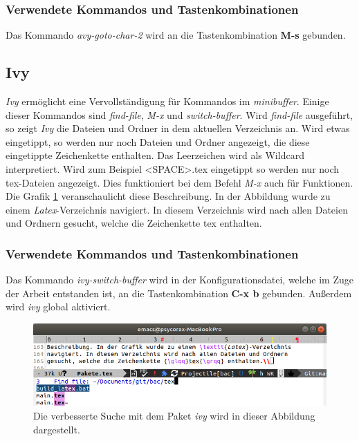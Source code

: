 \subsubsection{Verwendete Kommandos und Tastenkombinationen}
Das Kommando \textit{avy-goto-char-2} wird an die Tastenkombination
\textbf{M-s} gebunden.\\

\subsection{Ivy}
\label{subsec:ivy}
\textit{Ivy} ermöglicht eine Vervollständigung für Kommandos im
\textit{minibuffer}. Einige dieser Kommandos sind \textit{find-file},
\textit{M-x} und \textit{switch-buffer}. Wird \textit{find-file}
ausgeführt, so zeigt \textit{Ivy} die Dateien und Ordner in dem
aktuellen Verzeichnis an. Wird etwas eingetippt, so werden nur noch
Dateien und Ordner angezeigt, die diese eingetippte Zeichenkette
enthalten. Das Leerzeichen wird als Wildcard interpretiert. Wird zum
Beispiel {\glqq}<SPACE>.tex{\grqq} eingetippt so werden nur noch
tex-Dateien angezeigt. Dies funktioniert bei dem Befehl \textit{M-x}
auch für Funktionen. Die Grafik \ref{fig:ivy} veranschaulicht diese
Beschreibung. In der Abbildung wurde zu einem
\textit{Latex}-Verzeichnis navigiert. In diesem Verzeichnis wird nach
allen Dateien und Ordnern gesucht, welche die Zeichenkette
{\glqq}tex{\grqq} enthalten. \cite{Ivy}\\

\subsubsection{Verwendete Kommandos und Tastenkombinationen}
Das Kommando \textit{ivy-switch-buffer} wird in der
Konfigurationsdatei, welche im Zuge der Arbeit entstanden ist, an die
Tastenkombination \textbf{C-x b} gebunden. Außerdem wird \textit{ivy}
global aktiviert.\\

\begin{figure}[h]
  \centering
  \includegraphics[width=.95\textwidth]{./images/Pakete/ivy.png}
  \caption{\label{fig:ivy} Die verbesserte Suche mit dem Paket
    \textit{ivy} wird in dieser Abbildung dargestellt.}
\end{figure}

